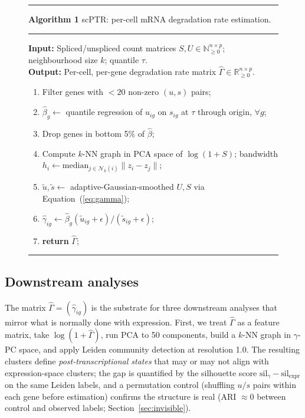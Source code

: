 \documentclass{article}
\begin{document}
\begin{figure}[h]
\hrule
\vspace{4pt}
\noindent\textbf{Algorithm 1} \quad scPTR: per-cell mRNA degradation rate estimation.
\vspace{4pt}
\hrule
\vspace{6pt}
\noindent\textbf{Input:} Spliced/unspliced count matrices $S, U \in \mathbb{N}_{\geq 0}^{n \times p}$; neighbourhood size $k$; quantile $\tau$.\\
\noindent\textbf{Output:} Per-cell, per-gene degradation rate matrix $\widehat{\Gamma} \in \mathbb{R}_{\geq 0}^{n \times p}$.
\vspace{4pt}
\begin{enumerate}
  \item Filter genes with $< 20$ non-zero $(u, s)$ pairs;
  \item $\widehat{\beta}_g \leftarrow$ quantile regression of $u_{ig}$ on $s_{ig}$ at $\tau$ through origin, $\forall g$;
  \item Drop genes in bottom 5\% of $\widehat{\beta}$;
  \item Compute $k$-NN graph in PCA space of $\log(1+S)$; bandwidth $h_i \leftarrow \mathrm{median}_{j \in \mathcal{N}_k(i)}\|z_i - z_j\|$;
  \item $\widetilde{u}, \widetilde{s} \leftarrow$ adaptive-Gaussian-smoothed $U, S$ via Equation~(\ref{eq:gamma});
  \item $\widehat{\gamma}_{ig} \leftarrow \widehat{\beta}_g(\widetilde{u}_{ig}+\epsilon)/(\widetilde{s}_{ig}+\epsilon)$;
  \item \textbf{return} $\widehat{\Gamma}$;
\end{enumerate}
\vspace{2pt}
\hrule
\label{alg:scptr}
\end{figure}

\subsection{Downstream analyses}

The matrix $\widehat{\Gamma}{=}(\widehat{\gamma}_{ig})$ is the substrate for three downstream analyses that mirror what is normally done with expression. First, we treat $\widehat{\Gamma}$ as a feature matrix, take $\log(1+\widehat{\Gamma})$, run PCA to 50 components, build a $k$-NN graph in $\gamma$-PC space, and apply Leiden community detection at resolution 1.0. The resulting clusters define \textit{post-transcriptional states} that may or may not align with expression-space clusters; the gap is quantified by the silhouette score $\text{sil}_\gamma - \text{sil}_{\text{expr}}$ on the same Leiden labels, and a permutation control (shuffling $u/s$ pairs within each gene before estimation) confirms the structure is real (ARI $\approx 0$ between control and observed labels; Section~\ref{sec:invisible}).
\end{document}

